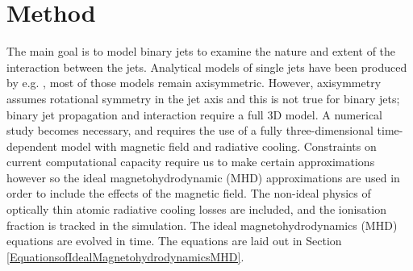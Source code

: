 \section{Method}\label{Simulation_And_Code}
The main goal is to model binary jets to examine the nature and extent of the interaction between the jets.
Analytical models of single jets have been 
produced by e.g. \citet{1994ApJ...429..781S}, most of those models remain axisymmetric.
However, axisymmetry assumes rotational symmetry in the jet axis and this is not true for binary jets; binary jet propagation and interaction require a full 3D model.
A numerical study becomes necessary, and requires the use of a fully three-dimensional time-dependent model with magnetic field and radiative cooling.
Constraints on current computational capacity require us to make 
certain approximations however so the ideal
magnetohydrodynamic (MHD) approximations are used in order to include the effects of the magnetic field.
The non-ideal physics of optically thin atomic 
radiative cooling losses are included, and the ionisation fraction is tracked in the simulation.
%
The ideal magnetohydrodynamics (MHD) equations are evolved in time.
The equations are laid out in Section \ref{EquationsofIdealMagnetohydrodynamicsMHD}.
%
%
%
%
%
%
